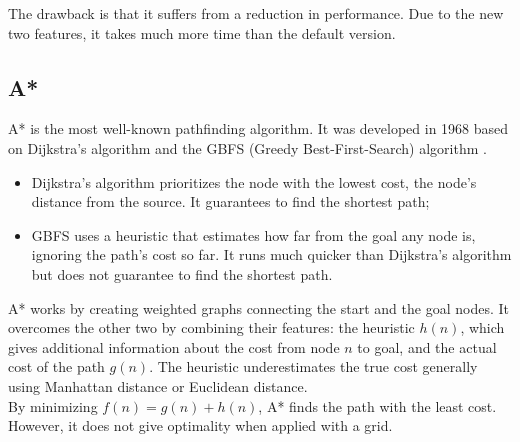 The drawback is that it suffers from a reduction in performance. Due to the new two features, it takes much more time than the default version.
\subsection{A*}
A* is the most well-known pathfinding algorithm. It was developed in 1968 based on Dijkstra's algorithm and the GBFS (Greedy Best-First-Search) algorithm \cite{hart1968formal}.
\begin{itemize}[itemsep=0pt]
	\item Dijkstra's algorithm prioritizes the node with the lowest cost, the node's distance from the source. It guarantees to find the shortest path;
	\item GBFS uses a heuristic that estimates how far from the goal any node is, ignoring the path's cost so far. It runs much quicker than Dijkstra's algorithm but does not guarantee to find the shortest path.

\end{itemize}
A* works by creating weighted graphs connecting the start and the goal nodes. It overcomes the other two by combining their features: the heuristic $h(n)$, which gives additional information about the cost from node $n$ to goal, and the actual cost of the path $g(n)$. The heuristic underestimates the true cost generally using Manhattan distance or Euclidean distance. \\
By minimizing $f(n)=g(n)+h(n)$, A* finds the path with the least cost. \\
However, it does not give optimality when applied with a grid.

